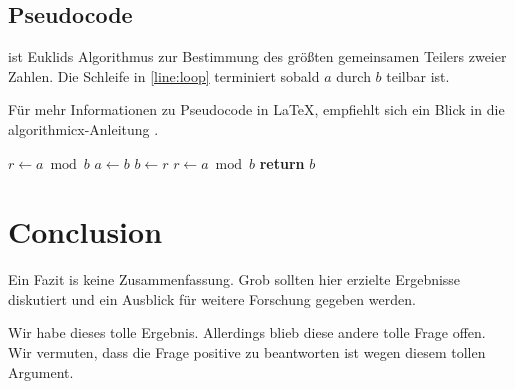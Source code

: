 \section{Pseudocode}

 ist Euklids Algorithmus zur Bestimmung des größten gemeinsamen Teilers zweier Zahlen.
Die Schleife in \cref{line:loop} terminiert sobald $a$ durch $b$ teilbar ist.

Für mehr Informationen zu Pseudocode in \LaTeX, empfiehlt sich ein Blick in die algorithmicx-Anleitung \cite{algorithmicx}.



\begin{algorithm}
	\caption{Euklids Algorithmus}\label{alg:euclid}
	\begin{algorithmic}[1]
		\State $r\gets a\bmod b$ 
		 \label{line:loop}
		\State $a\gets b$
		\State $b\gets r$
		\State $r\gets a\bmod b$
		\EndWhile
		\State \textbf{return} $b$
		\EndFunction
	\end{algorithmic}
\end{algorithm}


\chapter{Conclusion}

Ein Fazit is keine Zusammenfassung.
Grob sollten hier erzielte Ergebnisse diskutiert und ein Ausblick für weitere Forschung gegeben werden.

Wir habe dieses tolle Ergebnis.
Allerdings blieb diese andere tolle Frage offen.
Wir vermuten, dass die Frage positive zu beantworten ist wegen diesem tollen Argument.